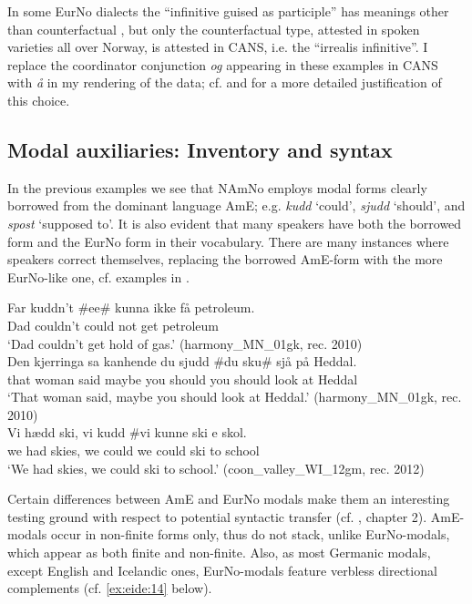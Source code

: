 \documentclass[output=paper]{langscibook}
\begin{document}
In some EurNo dialects the “infinitive guised as participle” has meanings other than counterfactual \citep{Sandøy1991}, but only the counterfactual type, attested in spoken varieties all over Norway, is attested in CANS, i.e. the “irrealis infinitive”. I replace the coordinator conjunction \textit{og} appearing in these examples in CANS with \textit{å} in my rendering of the data; cf. \citet{Eide2021} and \citet{Aa2022} for a more detailed justification of this choice. 

\subsection{Modal auxiliaries: Inventory and syntax} \label{subsect_modalauxs}

In the previous examples we see that NAmNo employs modal forms clearly borrowed from the dominant language AmE; e.g. \textit{kudd} ‘could’, \textit{sjudd} ‘should’, and \textit{spost} ‘supposed to’. It is also evident that many speakers have both the borrowed form and the EurNo form in their vocabulary. There are many instances where speakers correct themselves, replacing the borrowed AmE-form with the more EurNo-like one, cf. examples in . 

\ea%
    \label{ex:eide:12}
    \ea  
    \gll Far kuddn’t \#ee\# kunna ikke få petroleum.                  \\
         Dad couldn’t  {}       could not get petroleum       \\
    \glt ‘Dad couldn’t get hold of gas.’ (harmony\_MN\_01gk, rec. 2010)\\
    \ex  
    \gll Den kjerringa sa kanhende du sjudd \#du sku\# sjå på Heddal.      \\
         that woman said maybe you should you should look at Heddal   \\
    \glt ‘That woman said, maybe you should look at Heddal.’ (harmony\_MN\_01gk, rec. 2010)\\
    \ex  
    \gll Vi hædd ski, vi kudd \#vi kunne ski e skol.              \\
         we had skies, we could we could ski to school              \\
    \glt ‘We had skies, we could ski to school.’ (coon\_valley\_WI\_12gm, rec. 2012)\\
    \z %
\z

Certain differences between AmE and EurNo modals make them an interesting testing ground with respect to potential syntactic transfer (cf. \citealt{Eide2005}, chapter 2). AmE-modals occur in non-finite forms only, thus do not stack, unlike EurNo-modals, which appear as both finite and non-finite. Also, as most Germanic modals, except English and Icelandic ones, EurNo-modals feature verbless directional complements (cf. \ref{ex:eide:14} below).
\end{document}
